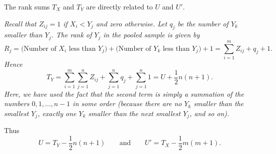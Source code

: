 The rank sums $T_X$ and $T_Y$ are directly related to $U$ and $U'$.

\vspace*{1ex}
\bit
\it Recall that $Z_{ij}=1$ if $X_i<Y_j$ and zero otherwise.
\it Let $q_j$ be the number of $Y_k$ smaller than $Y_j$.
\eit
\vspace*{2ex}
The rank of $Y_j$ in the pooled sample is given by
\vspace*{-1ex}
\[
R_j	
	= \text{(Number of $X_i$ less than $Y_j$)} + \text{(Number of $Y_k$ less than $Y_j$)} + 1
	= \sum_{i=1}^m Z_{ij} + q_j + 1.
\]
Hence
\[
T_Y
	= \sum_{i=1}^m\sum_{j=1}^n Z_{ij} + \sum_{j=1}^n q_j + \sum_{j=1}^n 1 
	= U + \frac{1}{2}n(n+1).
\]
Here, we have used the fact that the second term is simply a summation of the numbers $0,1,\ldots, n-1$ in some order (because there are no $Y_k$ smaller than the smallest $Y_j$, exactly one $Y_k$ smaller than the next smallest $Y_j$, and so on). 

Thus
\[
U = T_Y - \frac{1}{2}n(n+1) \qquad\text{and}\qquad U' = T_X - \frac{1}{2}m(m+1).
\]

